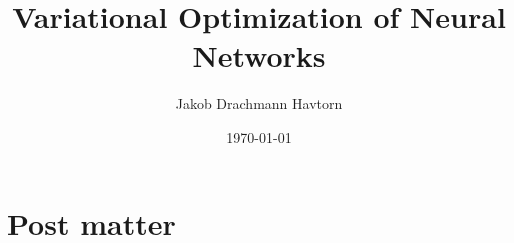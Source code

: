 










\title[Kongens Lyngby]{Variational Optimization of Neural Networks}
\author{Jakob Drachmann Havtorn}
\date{\today}








\section*{Post matter}






